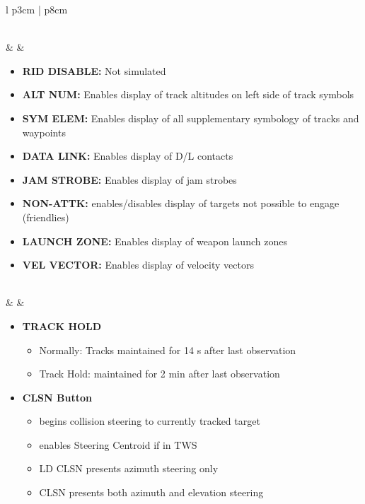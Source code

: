 \documentclass[fontHelvetica]{TechCheck}
\begin{document}
\begin{center}
\begin{longtable}{l p{3cm} | p{8cm}}
\begin{minipage}[t]{\linewidth}
			\end{minipage} \\
			\midrule
			\textbf{\textbullet} &    &
			\begin{minipage}[t]{\linewidth}
				\vspace{-7pt}
				\begin{itemize}
					\item \textbf{RID DISABLE:} Not simulated
					\item \textbf{ALT NUM:} Enables display of track altitudes on left side of track symbols
					\item \textbf{SYM ELEM:} Enables display of all supplementary symbology of tracks and waypoints
					\item \textbf{DATA LINK:} Enables display of D/L contacts
					\item \textbf{JAM STROBE:} Enables display of jam strobes
					\item \textbf{NON-ATTK:} enables/disables display of targets not possible to engage (friendlies)
					\item \textbf{LAUNCH ZONE:} Enables display of weapon launch zones
					\item \textbf{VEL VECTOR:} Enables display of velocity vectors
				\end{itemize}
			\end{minipage} \\
			\midrule
			\textbf{\textbullet} &    &
			\begin{minipage}[t]{\linewidth}
				\vspace{-7pt}
				\begin{itemize}
					\item \textbf{TRACK HOLD}
					\begin{itemize}
						\item Normally: Tracks maintained for 14 s after last observation
						\item Track Hold: maintained for 2 min after last observation
					\end{itemize}
					\item \textbf{CLSN Button}
					\begin{itemize}
						\item begins collision steering to currently tracked target
						\item enables Steering Centroid if in TWS
						\item LD CLSN presents azimuth steering only
						\item CLSN presents both azimuth and elevation steering

\end{itemize}
\end{itemize}
\end{minipage}
\end{longtable}
\end{center}
\end{document}
